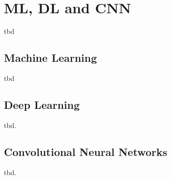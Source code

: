 
\section{ML, DL and CNN}\label{ord:ch2:sec1}
tbd

\subsection{Machine Learning}\label{ord:ch2:sec1:subsec1}
tbd

\subsection{Deep Learning}\label{ord:ch2:sec1:subsec2}
tbd.
\subsection{Convolutional Neural Networks}\label{ord:ch2:sec1:subsec3}
tbd.
